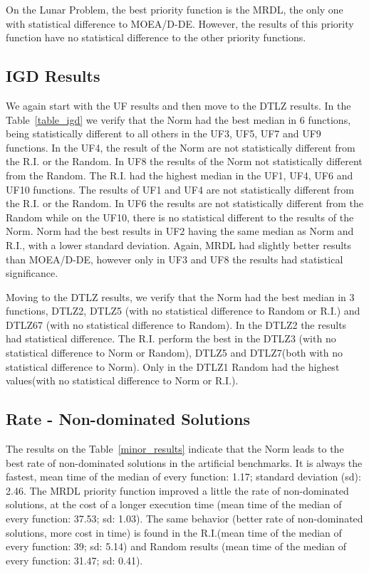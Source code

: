 On the Lunar Problem, the best priority function is the MRDL, the only one with statistical difference to MOEA/D-DE. However, the results of this priority function have no statistical difference to the other priority functions.

\subsection{IGD Results}

We again start with the UF results and then move to the DTLZ results. In the Table~\ref{table_igd} we verify that the Norm had the best median in 6 functions, being statistically different to all others in the UF3, UF5, UF7 and UF9 functions. In the UF4, the result of the Norm are not statistically different from the R.I. or the Random. In UF8 the results of the Norm not statistically different from the Random. The R.I. had the highest median in the UF1, UF4, UF6 and UF10 functions. The results of UF1 and UF4 are not statistically different from the R.I. or the Random. In UF6 the results are not statistically different from the Random while on the UF10, there is no statistical different to the results of the Norm. Norm had the best results in UF2 having the same median as Norm and R.I., with a lower standard deviation. Again, MRDL had slightly better results than MOEA/D-DE, however only in UF3 and UF8 the results had statistical significance.

Moving to the DTLZ results, we verify that the Norm had the best median in 3 functions, DTLZ2, DTLZ5 (with no statistical difference to Random or R.I.) and DTLZ67 (with no statistical difference to Random). In the DTLZ2 the results had statistical difference. The R.I. perform the best in the DTLZ3 (with no statistical difference to Norm or Random), DTLZ5 and DTLZ7(both with no statistical difference to Norm). Only in the DTLZ1  Random had the highest values(with no statistical difference to Norm or R.I.).

\subsection{Rate - Non-dominated Solutions}

The results on the Table~\ref{minor_results} indicate that the Norm leads to the best rate of non-dominated solutions in the artificial benchmarks. It is always the fastest, mean time of the median of every function: 1.17; standard deviation (sd): 2.46. The MRDL priority function improved a little the rate of non-dominated solutions, at the cost of a longer execution time (mean time of the median of every function: 37.53; sd: 1.03). The same behavior (better rate of non-dominated solutions, more cost in time) is found in the R.I.(mean time of the median of every function: 39; sd: 5.14) and Random results (mean time of the median of every function: 31.47; sd: 0.41).


